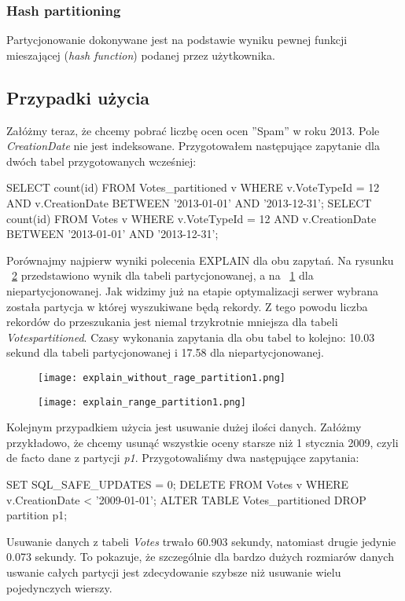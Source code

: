 \subsubsection{Hash partitioning}
Partycjonowanie dokonywane jest na podstawie wyniku pewnej funkcji mieszającej (\textit{hash function}) podanej przez użytkownika.

\subsection{Przypadki użycia}
Załóżmy teraz, że chcemy pobrać liczbę ocen ocen ''Spam'' w roku 2013. Pole \textit{CreationDate} nie jest indeksowane. Przygotowałem następujące zapytanie dla dwóch tabel przygotowanych wcześniej:
\begin{spverbatim}
	SELECT count(id) FROM Votes_partitioned v WHERE v.VoteTypeId = 12 AND v.CreationDate BETWEEN '2013-01-01' AND '2013-12-31'; 
	SELECT count(id) FROM Votes v WHERE v.VoteTypeId = 12 AND v.CreationDate BETWEEN '2013-01-01' AND '2013-12-31';
\end{spverbatim}
Porównajmy najpierw wyniki polecenia EXPLAIN dla obu zapytań. Na rysunku ~\ref{fig:explain_range_partition1} przedstawiono wynik dla tabeli partycjonowanej, a na ~\ref{fig:explain_without_rage_partition1} dla niepartycjonowanej. Jak widzimy już na etapie optymalizacji serwer wybrana została partycja w której wyszukiwane będą rekordy. Z tego powodu liczba rekordów do przeszukania jest niemal trzykrotnie mniejsza dla tabeli \textit{Votes\textunderscore partitioned}. Czasy wykonania zapytania dla obu tabel to kolejno: 10.03 sekund dla tabeli partycjonowanej i 17.58 dla niepartycjonowanej.
\begin{figure}
	\caption{}
	\centering
	\texttt{[image: explain\_without\_rage\_partition1.png]}
	\label{fig:explain_without_rage_partition1}
\end{figure}
\begin{figure}
	\caption{}
	\centering
	\texttt{[image: explain\_range\_partition1.png]}
	\label{fig:explain_range_partition1}
\end{figure}

Kolejnym przypadkiem użycia jest usuwanie dużej ilości danych. Załóżmy przykładowo, że chcemy usunąć wszystkie oceny starsze niż 1 stycznia 2009, czyli de facto dane z partycji \textit{p1}. Przygotowaliśmy dwa następujące zapytania:
\begin{spverbatim}
	SET SQL_SAFE_UPDATES = 0;
	DELETE FROM Votes v WHERE v.CreationDate < '2009-01-01';
	ALTER TABLE Votes_partitioned DROP partition p1;
\end{spverbatim}
Usuwanie danych z tabeli \textit{Votes} trwało 60.903 sekundy, natomiast drugie jedynie 0.073 sekundy. To pokazuje, że szczególnie dla bardzo dużych rozmiarów danych uswanie całych partycji jest zdecydowanie szybsze niż usuwanie wielu pojedynczych wierszy.

